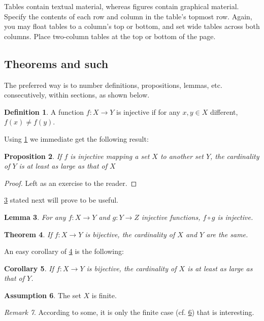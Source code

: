 \documentclass[nohyperref]{article}
\theoremstyle{plain}
\newtheorem{theorem}{Theorem}[section]
\newtheorem{proposition}[theorem]{Proposition}
\newtheorem{lemma}[theorem]{Lemma}
\newtheorem{corollary}[theorem]{Corollary}
\theoremstyle{definition}
\newtheorem{definition}[theorem]{Definition}
\newtheorem{assumption}[theorem]{Assumption}
\theoremstyle{remark}
\newtheorem{remark}[theorem]{Remark}
\begin{document}


Tables contain textual material, whereas figures contain graphical material.
Specify the contents of each row and column in the table's topmost
row. Again, you may float tables to a column's top or bottom, and set
wide tables across both columns. Place two-column tables at the
top or bottom of the page.

\subsection{Theorems and such}
The preferred way is to number definitions, propositions, lemmas, etc. consecutively, within sections, as shown below.
\begin{definition}
\label{def:inj}
A function $f:X \to Y$ is injective if for any $x,y\in X$ different, $f(x)\ne f(y)$.
\end{definition}
Using \cref{def:inj} we immediate get the following result:
\begin{proposition}
If $f$ is injective mapping a set $X$ to another set $Y$, 
the cardinality of $Y$ is at least as large as that of $X$
\end{proposition}
\begin{proof} 
Left as an exercise to the reader. 
\end{proof}
\cref{lem:usefullemma} stated next will prove to be useful.
\begin{lemma}
\label{lem:usefullemma}
For any $f:X \to Y$ and $g:Y\to Z$ injective functions, $f \circ g$ is injective.
\end{lemma}
\begin{theorem}
\label{thm:bigtheorem}
If $f:X\to Y$ is bijective, the cardinality of $X$ and $Y$ are the same.
\end{theorem}
An easy corollary of \cref{thm:bigtheorem} is the following:
\begin{corollary}
If $f:X\to Y$ is bijective, 
the cardinality of $X$ is at least as large as that of $Y$.
\end{corollary}
\begin{assumption}
The set $X$ is finite.
\label{ass:xfinite}
\end{assumption}
\begin{remark}
According to some, it is only the finite case (cf. \cref{ass:xfinite}) that is interesting.
\end{remark}
\end{document}
